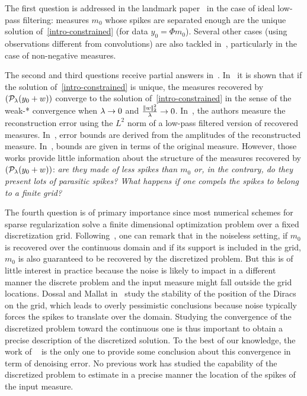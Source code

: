 The first question is addressed in the landmark paper~\cite{Candes-toward} in the case of ideal low-pass filtering: measures $m_0$ whose spikes are separated enough are the unique solution of~\eqref{intro-constrained} (for data $y_0=\Phi m_0$). Several other cases (using observations different from convolutions) are also tackled in~\cite{deCastro-beurling}, particularly in the case of non-negative measures.

The second and third questions receive partial answers in~\cite{Bredies-space-measures,Candes-superresol-noisy,Azais-inaccurate,Fernandez-Granda-support}. In~\cite{Bredies-space-measures} it is shown that if the solution of~\eqref{intro-constrained} is unique, the measures recovered by $(\mathcal{P}_\lambda(y_0+w))$ converge to the solution of~\eqref{intro-constrained} in the sense of the weak-* convergence when $\lambda \to 0$ and $\frac{|\!| w |\!|_2^2}{\lambda}\to 0$. In~\cite{Candes-superresol-noisy}, the authors measure the reconstruction error using the $L^2$ norm of a low-pass filtered version of recovered measures. In~\cite{Azais-inaccurate}, error bounds are derived from the amplitudes of the reconstructed measure. In~\cite{Fernandez-Granda-support}, bounds are given in terms of the original measure. However, those works provide little information about the structure of the measures recovered by $(\mathcal{P}_\lambda(y_0+w))$: \textit{are they made of less spikes than $m_0$ or, in the contrary, do they present lots of parasitic spikes? What happens if one compels the spikes to belong to a finite grid?}

The fourth question is of primary importance since most numerical schemes for sparse regularization solve a finite dimensional optimization problem over a fixed discretization grid. Following~\cite{Candes-toward}, one can remark that in the noiseless setting, if $m_0$ is recovered over the continuous domain and if its support is included in the grid, $m_0$ is also guaranteed to be recovered by the discretized problem. But this is of little interest in practice because the noise is likely to impact in a different manner the discrete problem and the input measure might fall outside the grid locations. Dossal and Mallat in~\cite{DossalMallat} study the stability of the position of the Diracs on the grid, which leads to overly pessimistic conclusions because noise typically forces the spikes to translate over the domain. Studying the convergence of the discretized problem toward the continuous one is thus important to obtain a precise description of the discretized solution. To the best of our knowledge, the work of ~\cite{Bhaskar-line-spectral} is the only one to provide some conclusion about this convergence in term of denoising error. No previous work has studied the capability of the discretized problem to estimate in a precise manner the location of the spikes of the input measure. 


